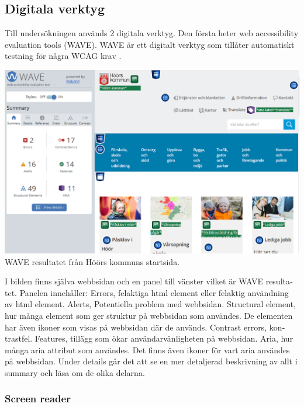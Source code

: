 \documentclass[11p]{article}
\begin{document}
\begin{otherlanguage}{swedish}
    \subsection{Digitala verktyg}
    Till undersökningen används 2 digitala verktyg.
    Den första heter web accessibility evaluation tools (WAVE).
    WAVE är ett digitalt verktyg som tillåter automatiskt testning för några WCAG krav \parencite{WAVE}.
    \newpage
    \begin{center}
    \includegraphics[width=1\textwidth]{../images/höörsKommunhemsida_WAVE.png} %
    WAVE resultatet från Höörs kommuns startsida.
    \end{center}
    I bilden finns själva webbsidan och en panel till vänster vilket är WAVE resultatet.
    Panelen innehåller:
    Errors, felaktiga html element eller felaktig användning av html element.
    Alerts, Potentiella problem med webbsidan.
    Structural element, hur många element som ger struktur på webbsidan som användes.
    De elementen har även ikoner som visas på webbsidan där de används.
    Contrast errors, kontrastfel.
    Features, tillägg som ökar användarvänligheten på webbsidan.
    Aria, hur många aria attribut som användes.
    Det finns även ikoner för vart aria användes på webbsidan.
    Under details går det att se en mer detaljerad beskrivning av allt i summary och läsa om de olika delarna.


    \subsubsection{Screen reader} %


\end{otherlanguage}
\end{document}
